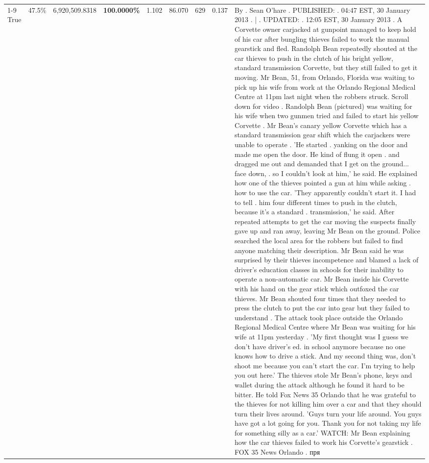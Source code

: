 \begin{table}[H]
\begin{tabular}{lllrlllll}
\cline{1-9} \cline{2-9}
True & 47.5\% & 6,920,509.8318 & \bfseries \color{red} 100.0000\% & 1.102 & 86.070 & 629 & 0.137 & By . Sean O'hare . PUBLISHED: . 04:47 EST, 30 January 2013 . | . UPDATED: . 12:05 EST, 30 January 2013 . A Corvette owner carjacked at gunpoint managed to keep hold of his car after bungling thieves failed to work the manual gearstick and fled. Randolph Bean repeatedly shouted at the car thieves to push in the clutch of his bright yellow, standard transmission Corvette, but they still failed to get it moving. Mr Bean, 51, from Orlando, Florida was waiting to pick up his wife from work at the Orlando Regional Medical Centre at 11pm last night when the robbers struck. Scroll down for video . Randolph Bean (pictured) was waiting for his wife when two gunmen tried and failed to start his yellow Corvette . Mr Bean's canary yellow Corvette which has a standard transmission gear shift which the carjackers were unable to operate . 'He started . yanking on the door and made me open the door. He kind of flung it open . and dragged me out and demanded that I get on the ground... face down, . so I couldn't look at him,' he said. He explained how one of the thieves pointed a gun at him while asking . how to use the car. 'They apparently couldn't start it. I had to tell . him four different times to push in the clutch, because it's a standard . transmission,' he said. After repeated attempts to get the car moving the suspects finally gave up and ran away, leaving Mr Bean on the ground. Police searched the local area for the robbers but failed to find anyone matching their description. Mr Bean said he was surprised by their thieves incompetence and blamed a lack of driver's education classes in schools for their inability to operate a non-automatic car. Mr Bean inside his Corvette with his hand on the gear stick which outfoxed the car thieves. Mr Bean shouted four times that they needed to press the clutch to put the car into gear but they failed to understand . The attack took place outside the Orlando Regional Medical Centre where Mr Bean was waiting for his wife at 11pm yesterday . 'My first thought was I guess we don't have driver's ed. in school anymore because no one knows how to drive a stick. And my second thing was, don't shoot me because you can't start the car. I'm trying to help you out here.' The thieves stole Mr Bean's phone, keys and wallet during the attack although he found it hard to be bitter. He told Fox News 35 Orlando that he was grateful to the thieves for not killing him over a car and that they should turn their lives around. 'Guys turn your life around. You guys have got a lot going for you. Thank you for not taking my life for something silly as a car.' WATCH: Mr Bean explaining how the car thieves failed to work his Corvette's gearstick . FOX 35 News Orlando . пря \\

\end{tabular}
\end{table}
